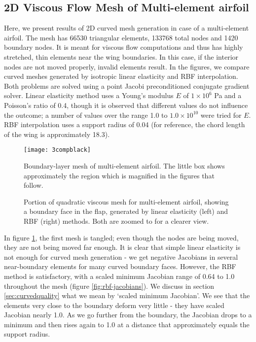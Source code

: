  \subsection{2D Viscous Flow Mesh of Multi-element airfoil}
 Here, we present results of 2D curved mesh generation in case of a multi-element airfoil. The mesh has 66530 triangular elements, 133768 total nodes and 1420 boundary nodes. It is meant for viscous flow computations and thus has highly stretched, thin elements near the wing boundaries. In this case, if the interior nodes are not moved properly, invalid elements result. In the figures, we compare curved meshes generated by isotropic linear elasticity and RBF interpolation. Both problems are solved using a point Jacobi preconditioned conjugate gradient solver. Linear elasticity method uses a Young's modulus $E$ of $1\times 10^6$ Pa and a Poisson's ratio of 0.4, though it is observed that different values do not influence the outcome; a number of values over the range 1.0 to $1.0 \times 10^{10}$ were tried for $E$. RBF interpolation uses a support radius of 0.04 (for reference, the chord length of the wing is approximately 18.3).
 
 \begin{figure}
 	\centering
 	\texttt{[image: 3compblack]}
 	\caption{Boundary-layer mesh of multi-element airfoil. The little box shows approximately the region which is magnified in the figures that follow.}
 \end{figure}
 
 \begin{figure}
 	\centering
 	\caption{Portion of quadratic viscous mesh for multi-element airfoil, showing a boundary face in the flap, generated by linear elasticity (left) and RBF (right) methods. Both are zoomed to for a clearer view.}
 	\label{fig:tangled2}
 \end{figure}
 
 In figure \ref{fig:tangled2}, the first mesh is tangled; even though the nodes are being moved, they are not being moved far enough. It is clear that simple linear elasticity is not enough for curved mesh generation - we get negative Jacobians in several near-boundary elements for many curved boundary faces. However, the RBF method is satisfactory, with a scaled minimum Jacobian range of 0.64 to 1.0 throughout the mesh (figure \ref{fig:rbf-jacobians}). We discuss in section \ref{sec:curvedquality} what we mean by `scaled minimum Jacobian'. We see that the elements very close to the boundary deform very little - they have scaled Jacobian nearly 1.0. As we go further from the boundary, the Jacobian drops to a minimum and then rises again to 1.0 at a distance that approximately equals the support radius.
 
